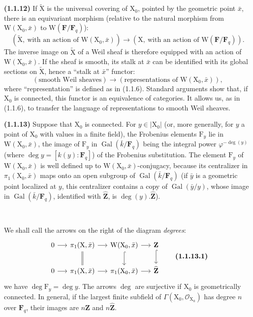 \documentclass[11pt,leqno]{article}
\newcommand{\Page}[1]{\ifvmode\noindent\else\unskip\ \fi{\footnotesize\textcolor{gray}{[p.\,#1]}}\ \ignorespaces}
\begin{document}
\textbf{(1.1.12)} If \(\widetilde{\mathrm{X}}\) is the universal covering of \(\mathrm{X}_0\), pointed by the geometric point \(\bar x\), there is an equivariant morphism (relative to the natural morphism from \(\mathrm{W}(\mathrm{X}_0,\bar x)\) to \(\mathrm{W}(\mathbf{F}/\mathbf{F}_q)\)):
\[
(\widetilde{\mathrm{X}},\ \text{with an action of }\mathrm{W}(\mathrm{X}_0,\bar x))
\to
(\mathrm{X},\ \text{with an action of }\mathrm{W}(\mathbf{F}/\mathbf{F}_q)).
\]
The inverse image on \(\widetilde{\mathrm{X}}\) of a Weil sheaf is therefore equipped with an action of \(\mathrm{W}(\mathrm{X}_0,\bar x)\). If the sheaf is smooth, its stalk at \(\bar x\) can be identified with its global sections on \(\widetilde{\mathrm{X}}\), hence a “stalk at \(\bar x\)” functor:
\[
(\text{smooth Weil sheaves})
\to
(\text{representations of }\mathrm{W}(\mathrm{X}_0,\bar x)),
\]
where “representation” is defined as in (1.1.6). Standard arguments show that, if \(\mathrm{X}_0\) is connected, this functor is an equivalence of categories. It allows us, as in (1.1.6), to transfer the language of representations to smooth Weil sheaves.

\textbf{(1.1.13)} Suppose that \(\mathrm{X}_0\) is connected. For \(y\in|\mathrm{X}_0|\) (or, more generally, for \(y\) a point of \(\mathrm{X}_0\) with values in a finite field), the Frobenius elements \(\mathrm{F}_y\) lie in \(\mathrm{W}(\mathrm{X}_0,\bar x)\), the image of \(\mathrm{F}_y\) in \(\operatorname{Gal}(\bar k/\mathbf{F}_q)\) being the integral power \(\varphi^{-\deg(y)}\) (where \(\deg y=[k(y):\mathbf{F}_q]\)) of the Frobenius substitution. The element \(\mathrm{F}_y\) of \(\mathrm{W}(\mathrm{X}_0,\bar x)\) is well defined up to \(\mathrm{W}(\mathrm{X}_0,\bar x)\)-conjugacy, because its centralizer in \(\pi_1(\mathrm{X}_0,\bar x)\) maps onto an open subgroup of \(\operatorname{Gal}(\bar k/\mathbf{F}_q)\) (if \(\bar y\) is a geometric point localized at \(y\), this centralizer contains a copy of \(\operatorname{Gal}(\bar y/y)\), whose image in \(\operatorname{Gal}(\bar k/\mathbf{F}_q)\), identified with \(\widehat{\mathbf{Z}}\), is \(\deg(y).\widehat{\mathbf{Z}}\)).

\Page{153}

We shall call the arrows on the right of the diagram \textit{degrees}:
\[
\begin{tikzcd}[column sep=1.4em,row sep=1.8em]
0 \arrow[r]
  & \pi_1(\mathrm{X},\bar{x}) \arrow[r] \arrow[d,equal]
  & \mathrm{W}(\mathrm{X}_0,\bar{x}) \arrow[r] \arrow[d,hook]
  & \mathbf{Z} \arrow[d,hook] \\
0 \arrow[r]
  & \pi_1(\mathrm{X},\bar{x}) \arrow[r]
  & \pi_1(\mathrm{X}_0,\bar{x}) \arrow[r]
  & \widehat{\mathbf{Z}}
\end{tikzcd}
\tag*{\textbf{(1.1.13.1)}}
\]
we have \(\deg \mathrm{F}_y=\deg y\). The arrows \(\deg\) are surjective if \(\mathrm{X}_0\) is geometrically connected. In general, if the largest finite subfield of \(\Gamma(\mathrm{X}_0,\mathscr{O}_{\mathrm{X}_0})\) has degree \(n\) over \(\mathbf{F}_q\), their images are \(n\mathbf{Z}\) and \(n\widehat{\mathbf{Z}}\).
\end{document}
